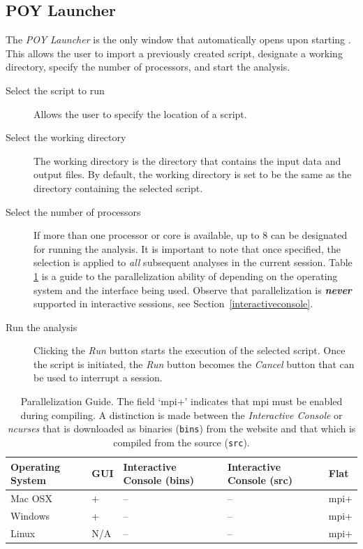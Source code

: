 \subsection{POY Launcher} 
The \emph{POY Launcher} is the only window that automatically 
opens upon starting \poy. This allows the user to import a previously 
created script, designate a working directory, specify the number of 
processors, and start the analysis.

\begin{description}
\item[Select the script to run] 
Allows the user to specify the location of a \poy script.
\item[Select the working directory] 
The working directory is the directory that contains 
the input data and output files. By default, the working directory is set to 
be the same as the directory containing the selected \poy script. 
\item[Select the number of processors] 
If more than one processor or core is available, up to 
8 can be designated for running the analysis. It is important to note 
that once specified, the selection is applied to \emph{all} subsequent 
analyses in the current \poy session. Table \ref{ParallelizationGuide} 
is a guide to the parallelization ability of \poy depending on the operating 
system and the \poy interface being used. Observe that parallelization 
is \textbf{\emph {never}} supported in interactive sessions, see 
Section~\ref{interactiveconsole}.
\item[Run the analysis] 
Clicking the \emph{Run} button starts the execution of the selected 
script. Once the script is initiated, the \emph{Run} button becomes 
the \emph{Cancel} button that can be used to interrupt a \poy session.
\end{description}

\begin{table}[t] 
\small
\caption{Parallelization Guide. The field `mpi+' indicates that mpi 
must be enabled during compiling. A distinction is made between the 
\emph{Interactive Console} or \emph{ncurses} that is downloaded as 
binaries (\texttt{bins}) from the website and that which is compiled 
from the source (\texttt{src}).} 
\label{ParallelizationGuide} 
\begin{center}
\renewcommand{\arraystretch}{1.5}
\begin{tabular}{p{2.7cm}  p{1.1cm}  p{3.0cm}  p{3.0cm}  p{0.75cm}} 
\hline
Operating System & GUI & Interactive Console (bins) & Interactive Console (src) & Flat \\
\hline
Mac OSX & + & -- & -- & mpi+ \\
Windows & + & -- & -- & mpi+ \\
Linux & N/A & -- & -- & mpi+ \\
\hline
\end{tabular}
\end{center}
\end{table}

